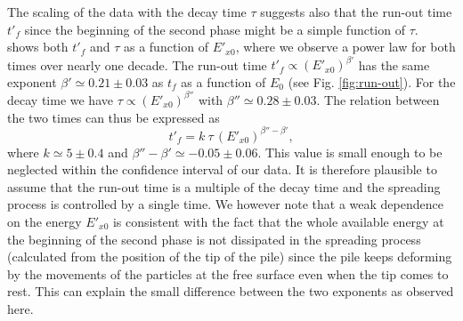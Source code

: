 The scaling of the data with the decay time $\tau$ suggests also that the 
run-out time $t'_f$ since the beginning of the second phase might be a simple 
function of $\tau$.~ shows both $t'_f$ and $\tau$ as 
a function of $E'_{x0}$, where we observe a power law for both times over 
nearly one decade. The run-out time $t'_f \propto (E'_{x0})^{\beta'}$ has the 
same exponent $\beta' \simeq 0.21 \pm 0.03$ as $t_f$ as a function of $E_0$ 
(see Fig. \ref{fig:run-out}). For the decay time we have 
$\tau \propto (E'_{x0})^{\beta''}$ with $\beta'' \simeq 0.28 \pm 0.03$. The 
relation between the two times can thus be expressed as 
\begin{equation}
t'_f = k  \ \tau \, (E'_{x0})^{\beta'' - \beta'}, 
\label{eqn:t'f}
\end{equation}
where $k \simeq 5 \pm 0.4$ and $\beta'' - \beta' \simeq -0.05 \pm 0.06$. This 
value is small enough to be neglected within the confidence interval of our 
data. It is therefore plausible to assume that  the run-out time is a multiple 
of the decay time and the spreading process is controlled by a single time. We 
however note that a weak dependence on the energy $E'_{x0}$  is consistent with 
the fact that the whole available energy at the beginning of the second phase 
is not dissipated in the spreading process (calculated from the position of the 
tip of the pile) since  the pile keeps deforming by the movements of the 
particles at the free surface even when the tip comes to rest. 
This can explain the small difference between the two exponents as observed 
here.


